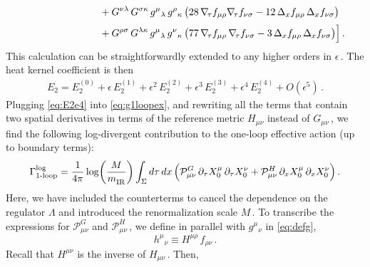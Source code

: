 \documentclass[11pt]{article}
\newcommand{\be}{\begin{equation}}
\newcommand{\ee}{\end{equation}}
\newcommand{\CP}{\mathcal{P}}
\newcommand{\lr}{\left (}
\newcommand{\rr}{\right )}
\newcommand{\p}{\partial}
\begin{document}
\begin{subequations}
\begin{align}
		& \qquad\qquad\qquad\hspace{5mm} + G^{\nu\lambda} \, G^{\sigma\kappa} \, g^{\mu}{}_{\lambda} \, g^{\rho}{}_{\kappa} \, \bigl( 28 \, \nabla_{\!\tau} f_{\mu\rho} \nabla_{\!\tau} f_{\nu\sigma} -12 \, \Delta_x f_{\mu\rho} \, \Delta_x f_{\nu\sigma} \bigr) \notag \\[2pt]
		& \qquad\qquad\qquad\hspace{5mm}  + G^{\rho\sigma} \, G^{\lambda\kappa} \, g^\mu{}_\lambda \, g^{\nu}{}_{\kappa} \, \bigl( 77 \, \nabla_{\!\tau} f_{\mu\rho} \, \nabla_{\!\tau} f_{\nu\sigma} - 3 \, \Delta_x f_{\mu\rho} \, \Delta_x f_{\nu\sigma} \bigr) \Bigr]\,.
\end{align}
\end{subequations}
%
This calculation can be straightforwardly extended to any higher orders in $\epsilon$\,.
The heat kernel coefficient is then
%
\begin{align} \label{eq:E2e4}
	E_2 = E_2^{(0)} + \epsilon \, E_2^{(1)} + \epsilon^2 \, E_2^{(2)} + \epsilon^3 \, E_2^{(3)} + \epsilon^4 \, E_2^{(4)} + O(\epsilon^5)\,.
\end{align}
%
Plugging \eqref{eq:E2e4} into \eqref{eq:g1loopex}, and rewriting all the terms that contain two spatial derivatives in terms of the reference metric $H_{\mu\nu}$ instead of $G_{\mu\nu}$\,, 
we find the following log-divergent  contribution to the one-loop effective action (up to boundary terms):
%
\begin{align} \label{eq:Gammalog}
	\Gamma_\text{1-loop}^\text{log} = \frac{1}{4\pi} \log \! \lr \frac{M}{m^{}_\text{IR}} \rr \int_\Sigma d\tau \, d x \, \Bigl( \CP_{\mu\nu}^G \, \p_\tau X^\mu_0 \, \p_\tau X^\nu_0 + \CP_{\mu\nu}^H \, \p_x X^\mu_0 \, \p_x X^\nu_0 \Bigr)\,.
\end{align}
%
Here, we have included the counterterms to cancel the dependence on the regulator $\Lambda$ and introduced the renormalization scale $M$\,.
To transcribe the expressions for $\CP_{\mu\nu}^G$ and $\CP_{\mu\nu}^H$\,, we define in parallel with $g^\mu{}_\nu$ in \eqref{eq:defg},
%
\be
	h^\mu{}_\nu \equiv H^{\mu\rho} \, f_{\rho\nu}\,.
\ee
%
Recall that $H^{\mu\nu}$ is the inverse of $H_{\mu\nu}$\,. Then,
%
\end{document}
